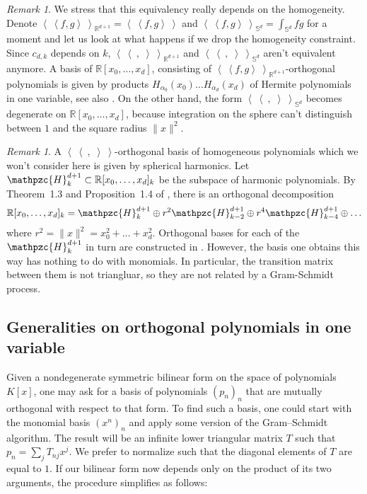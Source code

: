 \documentclass{amsart}
\newcommand{\bra}{\left<\!\!\!\:\left<}
\newcommand{\ket}{\right>\!\!\!\:\right>}
\newcommand{\R}{\mathbb{R}}
\renewcommand{\S}{\mathbb{S}}
\newcommand{\Har}{\mathpzc{H}}
\theoremstyle{plain}
\theoremstyle{definition}
\theoremstyle{remark}
\newtheorem{remark}[theorem]{Remark}
\begin{document}
\begin{remark}\label{hermite}
We stress that this equivalency really depends on the homogeneity. Denote $\bra f ,g\ket_{\R^{d+1}} = \bra f,g\ket$ and $\bra f ,g\ket_{\S^{d}}=\int_{\S^{d}} f g$ for a moment and let us look at what happens if we drop the homogeneity constraint. Since $c_{d,k}$ depends on $k$, $\bra\ ,\;\ket_{\R^{d+1}}$ and $\bra\ ,\;\ket_{\S^d}$ aren't equivalent anymore. A basis of $\R[x_0,\ldots,x_d]$, consisting of $\bra f ,g\ket_{\R^{d+1}}$-orthogonal polynomials is given by products $H_{\alpha_0}\!(x_0)\ldots H_{\alpha_d}\!(x_d)$ of Hermite polynomials in one variable, see also \cite[Sect.~2.3.4]{Dunkl}. On the other hand, the form $\bra\ ,\;\ket_{\S^d}$ becomes degenerate on $\R[x_0,\ldots,x_d]$, because integration on the sphere can't distinguish between $1$ and the square radius $\|x\|^2$. 
\end{remark}

\begin{remark}\label{sphericalharmonics}
A $\bra\ ,\;\ket$-orthogonal basis of homogeneous polynomials which we won't consider here is given by spherical harmonics. Let $\Har^{d+1}_k \subset \R[x_0,\ldots,x_d]_k$ be the subspace of harmonic polynomials. By Theorem~1.3 and Proposition~1.4 of \cite{Dai}, there is an orthogonal decomposition
$$
\R[x_0,\ldots,x_d]_k = \Har^{d+1}_k \oplus r^2 \Har^{d+1}_{k-2}\oplus r^4 \Har^{d+1}_{k-4}\oplus \ldots
$$
where $r^2 = \|x\|^2= x_0^2+\ldots +x_d^2$. Orthogonal bases for each of the $\Har^{d+1}_k$ in turn are constructed in \cite[Sect.~2.2]{Dunkl}. However, the basis one obtains this way has nothing to do with monomials. In particular, the transition matrix between them is not triangluar, so they are not related by a Gram-Schmidt process.
\end{remark}




\subsection{Generalities on orthogonal polynomials in one variable}
Given a nondegenerate symmetric bilinear form on the space of polynomials $K[x]$, one may ask for a basis of polynomials $(p_n)_n$ that are mutually orthogonal with respect to that form. To find such a basis, one could start with the monomial basis $(x^n)_n$ and apply some version of the Gram--Schmidt algorithm. The result will be an infinite lower triangular matrix $T$ such that $p_n =\sum_j T_{nj} x^j$. We prefer to normalize such that the diagonal elements of $T$ are equal to $1$. If our bilinear form now depends only on the product of its two arguments, the procedure simplifies as follows:
\end{document}
